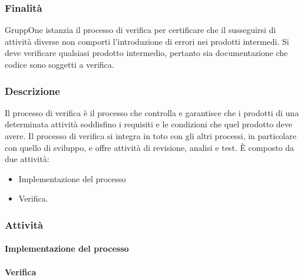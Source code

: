 \documentclass[../../norme-di-progetto.tex]{subfiles}
\begin{document}
\subsubsection{Finalità}%
\label{subs:verifica/finalita}

GruppOne istanzia il processo di verifica per certificare che il susseguirsi di attività diverse non comporti l'introduzione di errori nei prodotti intermedi.
Si deve verificare qualsiasi prodotto intermedio, pertanto sia documentazione che codice sono soggetti a verifica.

\subsubsection{Descrizione}%
\label{subs:verifica/descrizione}

Il processo di verifica è il processo che controlla e garantisce che i prodotti di una determinata attività soddisfino i requisiti e le condizioni che quel prodotto deve avere. Il processo di verifica si integra in toto con gli altri processi, in particolare con quello di sviluppo, e offre attività di revisione, analisi e test. È composto da due attività:

\begin{itemize}
  \item Implementazione del processo
  \item Verifica.
\end{itemize}

\subsubsection{Attività}%
\label{subs:verifica/attivita}

\paragraph{Implementazione del processo}%
\label{par:implementazione_di_processo}



\paragraph{Verifica}%
\label{par:verifica}


\end{document}
